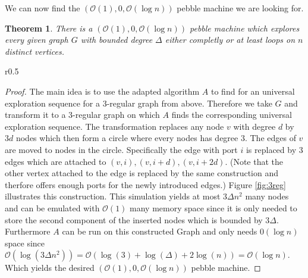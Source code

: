 \documentclass[draft,oneside]{scrartcl}
\newtheorem{thm}{Theorem}
\begin{document}
We can now find the $(\mathcal{O}(1),0,\mathcal{O}(\log n))$ pebble machine we
are looking for.
\begin{thm}
  \label{thm:pebblewalk}
  There is a $(\mathcal{O}(1),0,\mathcal{O}(\log n))$ pebble machine which
  explores every given graph $G$ with bounded degree $\Delta$ either completly
  or at least loops on $n$ distinct vertices.
\end{thm}
\begin{wrapfigure}{r}{0.5\textwidth}
  \caption{Illustration how to transform any graph to a 3-regular graph.}
  \label{fig:3reg}
  \resizebox{0.5\textwidth}{!}{}
\end{wrapfigure}
\begin{proof}
  The main idea is to use the adapted algorithm $A$ to find for an
  universal exploration sequence for a 3-regular graph from above. Therefore
  we take $G$ and transform it to a 3-regular graph on which $A$ finds the
  corresponding universal exploration sequence. The transformation replaces
  any node $v$ with degree $d$ by $3d$ nodes which then form a circle where
  every nodes has degree $3$. The edges of $v$ are moved to nodes in the
  circle. Specifically the edge with port $i$ is replaced by 3 edges which are
  attached to $(v,i), (v,i+d), (v,i+2d)$. (Note that the other
  vertex attached to the edge is replaced by the same construction and therfore
  offers enough ports for the newly introduced edges.) Figure \ref{fig:3reg}
  illustrates this construction.  This simulation yields at most
  $3\Delta n^{2}$ many nodes and can be emulated with $\mathcal{O}(1)$ many
  memory space since it is only needed to store the second component of the
  inserted nodes which is bounded by $3\Delta$. Furthermore $A$ can be run on
  this constructed Graph and only needs $\mathcal{0}(\log n)$ space since
  $\mathcal{O}(\log(3\Delta n^{2})) = \mathcal{O}(\log(3) + \log(\Delta) +
  2\log(n)) = \mathcal{O}(\log n)$. Which yields the desired
  $(\mathcal{O}(1),0,\mathcal{O}(\log n))$ pebble machine.
\end{proof}
\end{document}
